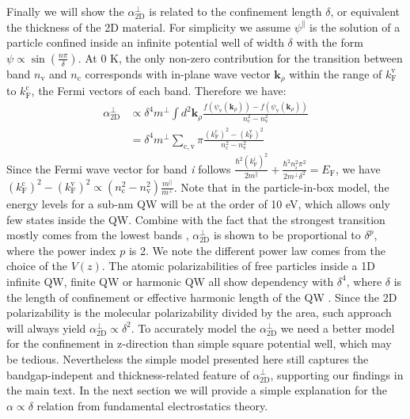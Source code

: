 \documentclass[manuscript=suppinfo,email=true,hyperref=true,keywords=false]{achemso}
\begin{document}
Finally we will show the $\alpha_{\mathrm{2D}}^{\perp}$ is related to the
confinement length $\delta$, or equivalent the thickness of the 2D
material. For simplicity we assume $\psi^{\parallel}$ is the solution
of a particle confined inside an infinite potential well of width
$\delta$ with the form $\psi \propto \sin(\frac{n\pi}{\delta})$. At 0
K, the only non-zero contribution for the transition between band
$n_{\mathrm{v}}$ and $n_{\mathrm{c}}$ corresponds with in-plane wave
vector $\mathbf{k}_{\rho}$ within the range of $k_{\mathrm{F}}^{\mathrm{v}}$ to
$k_{\mathrm{F}}^{\mathrm{c}}$, the Fermi vectors of each band. Therefore we have:
\begin{equation}
  \begin{aligned}
    \alpha_{\mathrm{2D}}^{\perp} &\propto \delta^{4} m^{\perp} \int
    d^{2}\mathbf{k}_{\rho}
    \frac{f(\psi_{\mathrm{v}}(\mathbf{k}_{\rho}))
      -f(\psi_{\mathrm{v}}(\mathbf{k}_{\rho})) }{n_{\mathrm{c}}^{2} -
      n_{\mathrm{v}}^{2}}\\
    &= \delta^{4} m^{\perp} \sum_{\mathrm{c, v}}\pi \frac{
      (k_{\mathrm{F}}^{\mathrm{c}})^{2} -
        (k_{\mathrm{F}}^{\mathrm{v}})^{2}}{n_{\mathrm{c}}^{2} -
        n_{\mathrm{v}}^{2}}
  \end{aligned}
\end{equation}
Since the Fermi wave vector for band \textit{i} follows
${\displaystyle
  \frac{\hbar^{2}(k_{\mathrm{F}}^{i})^{2}}{2m^{\parallel}}} +
{\displaystyle \frac{\hbar^{2} n_{i}^{2} \pi^{2}}{2m^{\perp}
    \delta^{2}}} = E_{\mathrm{F}}$, we have
$ (k_{\mathrm{F}}^{\mathrm{c}})^{2} -
(k_{\mathrm{F}}^{\mathrm{v}})^{2} \propto (n_{\mathrm{c}}^{2} -
n_{\mathrm{v}}^{2}) {\displaystyle
  \frac{m^{\parallel}}{m^{\perp}}}$. Note that in the particle-in-box
model, the energy levels for a sub-nm QW will be at the order of 10
eV, which allows only few states inside the QW. Combine with the fact
that the strongest transition mostly comes from the lowest bands
\cite{davies_physics_1997}, $\alpha^{\perp}_{\mathrm{2D}}$ is shown to
be proportional to $\delta^{p}$, where the power index $p$ is 2. We
note the different power law comes from the choice of the $V(z)$. The
atomic polarizabilities of free particles inside a 1D infinite QW,
finite QW or harmonic QW all show dependency with $\delta^{4}$, where
$\delta$ is the length of confinement or effective harmonic length of
the QW \cite{Fowler_1984,Maize_2011}. Since the 2D polarizability is
the molecular polarizability divided by the area, such approach will
always yield $\alpha_{\mathrm{2D}}^{\perp} \propto \delta^{2}$. To
accurately model the $\alpha_{\mathrm{2D}}^{\perp}$ we need a better
model for the confinement in z-direction than simple square potential
well, which may be tedious. Nevertheless the simple model presented
here still captures the bandgap-indepent and thickness-related feature
of $\alpha_{\mathrm{2D}}^{\perp}$, supporting our findings in the main
text. In the next section we will provide a simple explanation for the $\alpha \propto \delta$ relation from fundamental electrostatics theory.
\end{document}
